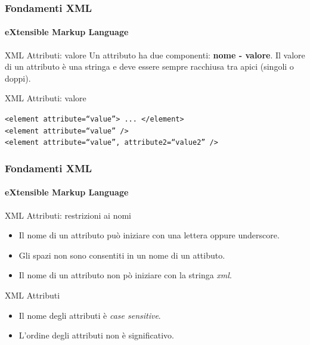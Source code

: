 \begin{frame}
    \frametitle{Fondamenti XML}
    \framesubtitle{eXtensible Markup Language}
    \addtocounter{nframe}{1}

	\begin{block}{XML Attributi: valore}
		Un attributo ha due componenti: \textbf{nome - valore}.
		Il valore di un attributo è una stringa e deve essere sempre racchiusa tra apici (singoli o doppi).
	\end{block}

	\begin{block}{XML Attributi: valore}
		\begin{center}
			\texttt{<element attribute=``value''> ... </element>}
			\\\texttt{<element attribute=``value'' />}
			\\\texttt{<element attribute=``value'', attribute2=``value2'' />}
		\end{center}
	\end{block}

\end{frame}

\begin{frame}
    \frametitle{Fondamenti XML}
    \framesubtitle{eXtensible Markup Language}
    \addtocounter{nframe}{1}

	\begin{block}{XML Attributi: restrizioni ai nomi}
		\begin{itemize}
			\item Il nome di un attributo può iniziare con una lettera oppure underscore.
			\item Gli spazi non sono consentiti in un nome di un attibuto.
			\item Il nome di un attributo non pò iniziare con la stringa \textit{xml}.
		\end{itemize}
	\end{block}

	\begin{block}{XML Attributi}
		\begin{itemize}
			\item Il nome degli attributi è \textit{case sensitive}.
			\item L'ordine degli attributi non è significativo.
		\end{itemize}
	\end{block}

\end{frame}




